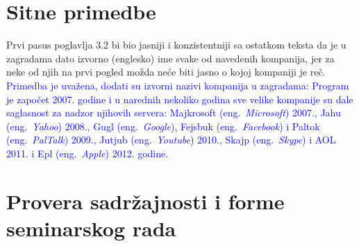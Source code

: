 \documentclass[a4paper]{report}
\newcommand{\odgovor}[1]{\textcolor{blue}{#1}}
\begin{document}
\section{Sitne primedbe}
Prvi pasus poglavlja 3.2 bi bio jasniji i konzistentniji sa ostatkom teksta da je u zagradama dato izvorno (englesko) ime svake od navedenih kompanija, jer za neke od njih na prvi pogled možda neće biti jasno o kojoj kompaniji je reč.
\odgovor {Primedba je uvažena, dodati su izvorni nazivi kompanija u zagradama: Program je započet 2007. godine i u narednih nekoliko godina sve velike kompanije su dale saglasnost za nadzor njihovih servera: Majkrosoft (eng.~{\em Microsoft}) 2007., Jahu (eng.~{\em Yahoo}) 2008., Gugl (eng.~{\em Google}), Fejsbuk (eng.~{\em Facebook}) i Paltok (eng.~{\em PalTalk}) 2009., Jutjub (eng.~{\em Youtube}) 2010., Skajp (eng.~{\em Skype}) i AOL 2011. i Epl (eng.~{\em Apple}) 2012. godine. }

\section{Provera sadržajnosti i forme seminarskog rada}
\end{document}
